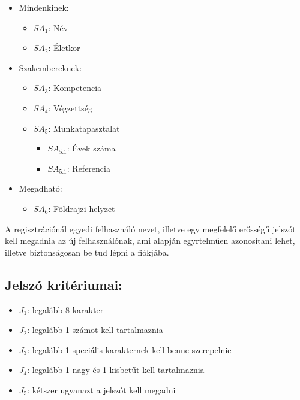 \begin{itemize}
    \item Mindenkinek:
    \begin{itemize}
        \item ${SA}_1$: Név
        \item ${SA}_2$: Életkor
    \end{itemize}
    \item Szakembereknek:
    \begin{itemize}
        \item ${SA}_3$: Kompetencia
        \item ${SA}_4$: Végzettség
        \item ${SA}_5$: Munkatapasztalat
        \begin{itemize}
            \item ${SA}_{5.1}$: Évek száma
            \item ${SA}_{5.1}$: Referencia
        \end{itemize}
    \end{itemize}
    
    \item Megadható:
    \begin{itemize}
        \item ${SA}_6$: Földrajzi helyzet
    \end{itemize}
\end{itemize}

A regisztrációnál egyedi felhasználó nevet, illetve egy megfelelő erősségű jelszót kell megadnia az új felhasználónak, ami alapján egyrtelműen azonosítani lehet, illetve biztonságosan be tud lépni a fiókjába.

\subsection{Jelszó kritériumai:}

\begin{itemize}
    \item $J_1$: legalább 8 karakter
    \item $J_2$: legalább 1 számot kell tartalmaznia
    \item $J_3$: legalább 1 speciális karakternek kell benne szerepelnie
    \item $J_4$: legalább 1 nagy és 1 kisbetűt kell tartalmaznia
    \item $J_5$: kétszer ugyanazt a jelszót kell megadni
\end{itemize}

